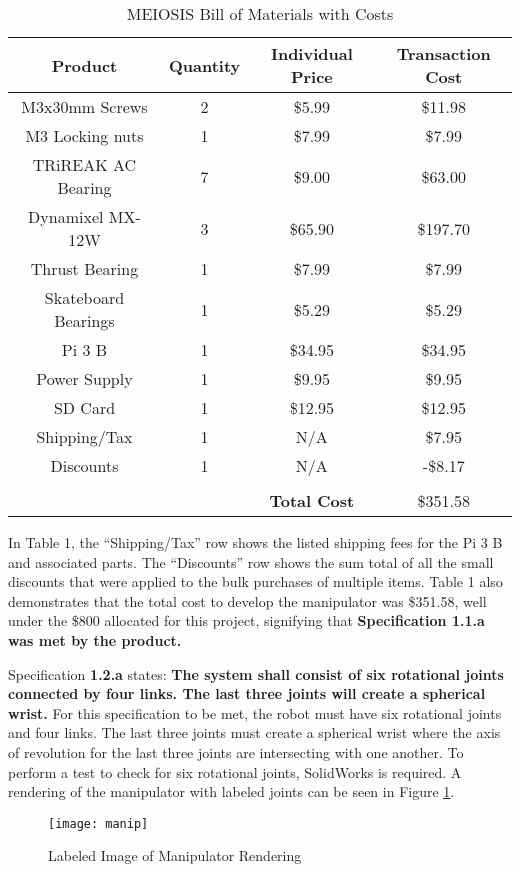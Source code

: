\begin{table}[htp]
  \centering
  \caption{MEIOSIS Bill of Materials with Costs}
  \label{tab:bom}
  \begin{tabular}{c|c|c|c}
  Product & Quantity & Individual Price & Transaction Cost \\\hline
  M3x30mm Screws & 2 & \$5.99 & \$11.98 \\
  M3 Locking nuts & 1 & \$7.99 & \$7.99 \\
  TRiREAK AC Bearing & 7 & \$9.00 & \$63.00 \\
  Dynamixel MX-12W & 3 & \$65.90 & \$197.70 \\
  Thrust Bearing & 1 & \$7.99 & \$7.99 \\
  Skateboard Bearings & 1 & \$5.29 & \$5.29 \\
  Pi 3 B & 1 & \$34.95 & \$34.95 \\
  Power Supply & 1 & \$9.95 & \$9.95 \\
  SD Card & 1 & \$12.95 & \$12.95 \\
  Shipping/Tax & 1 & N/A & \$7.95 \\
  Discounts & 1 & N/A & -\$8.17 \\
  &&&\\
  & & \textbf{Total Cost} & \$351.58 \\
  \end{tabular}
\end{table}

In Table 1, the “Shipping/Tax” row shows the listed shipping fees for the Pi 3 B and associated parts. The “Discounts” row shows the sum total of all the small discounts that were applied to the bulk purchases of multiple items. Table 1 also demonstrates that the total cost to develop the manipulator was \$351.58, well under the \$800 allocated for this project, signifying that \textbf{Specification 1.1.a was met by the product.}


Specification \textbf{1.2.a} states: \textbf{The system shall consist of six rotational joints connected by four links. The last three joints will create a spherical wrist.} For this specification to be met, the robot must have six rotational joints and four links. The last three joints must create a spherical wrist where the axis of revolution for the last three joints are intersecting with one another. To perform a test to check for six rotational joints, SolidWorks is required. A rendering of the manipulator with labeled joints can be seen in Figure \ref{fig:manip}.


\begin{figure}[htp]
  \centering
  \texttt{[image: manip]}
  \caption{Labeled Image of Manipulator Rendering}
  \label{fig:manip}
\end{figure}

